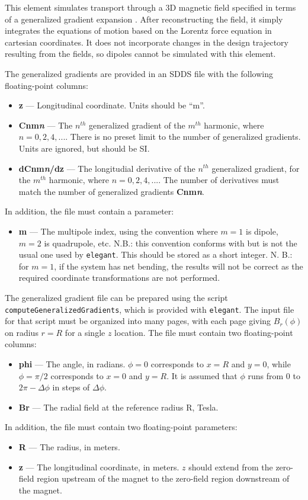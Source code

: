This element simulates transport through a 3D magnetic field
specified in terms of a generalized gradient expansion \cite{Venturini-NIMA427-387}.
After reconstructing the field, it simply integrates the equations of motion
based on the Lorentz force equation in cartesian coordinates.  It does not
incorporate changes in the design trajectory resulting from the
fields, so dipoles cannot be simulated with this element.

The generalized gradients are provided in an SDDS file with the following floating-point columns:
\begin{itemize}
\item {\bf z} --- Longitudinal coordinate. Units should be ``m''.
\item {\bf Cnm{\em n}} --- The $n^{th}$ generalized gradient of the $m^{th}$ harmonic, where $n=0,2,4,...$.
  There is no preset limit to the number of generalized gradients. Units are ignored,
  but should be SI.
\item {\bf dCnm{\em n}/dz} --- The longitudial derivative of the $n^{th}$ generalized gradient, 
  for the $m^{th}$ harmonic, where $n=0,2,4,...$.
  The number of derivatives must match the number of generalized gradients {\bf Cnm{\em n}}.
\end{itemize}
In addition, the file must contain a parameter:
\begin{itemize}
\item {\bf m} --- The multipole index, using the convention where $m=1$ is dipole, $m=2$ is quadrupole,
  etc. N.B.: this convention conforms with \cite{Venturini-NIMA427-387} but is not the usual one used by
  {\tt elegant}. This should be stored as a short integer.
  N. B.: for $m=1$, if the system has net bending, the results will not be correct as the required coordinate
  transformations are not performed.
\end{itemize}

The generalized gradient file can be prepared using the script {\tt computeGeneralizedGradients}, which is
provided with {\tt elegant}. The input file for that script must be organized into many pages, with
each page giving $B_r(\phi)$ on radius $r=R$ for a single $z$ location. The file must contain two floating-point columns:
\begin{itemize}
\item {\bf phi} --- The angle, in radians. $\phi=0$ corresponds to $x=R$ and $y=0$, while $\phi=\pi/2$ corresponds
  to $x=0$ and $y=R$. It is assumed that $\phi$ runs from $0$ to $2\pi - \Delta \phi$ in steps of $\Delta \phi$.
\item {\bf Br} --- The radial field at the reference radius R, Tesla.
\end{itemize}
In addition, the file must contain two floating-point parameters:
\begin{itemize}
\item {\bf R} --- The radius, in meters. 
\item {\bf z} --- The longitudinal coordinate, in meters. $z$ should extend from the zero-field region upstream of the magnet to 
  the zero-field region downstream of the magnet.
\end{itemize}
